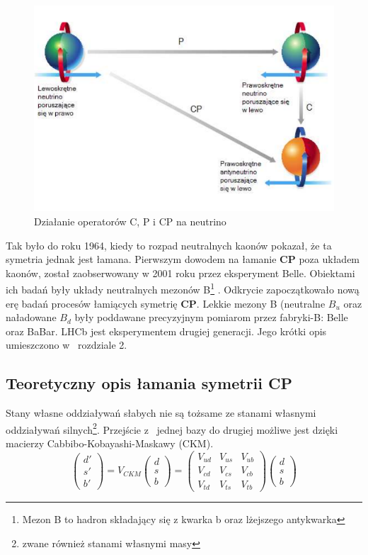  \begin{figure}[ht]
 \centering
 \includegraphics[scale=0.5]{rozdzial1/CP.png}
 \caption{Działanie operatorów C, P i CP na neutrino}
 \label{fig:CP}
\end{figure}


 Tak było do roku 1964, kiedy to rozpad neutralnych kaonów pokazał, że ta symetria jednak jest łamana. Pierwszym dowodem na łamanie  \textbf{CP} poza układem kaonów, został zaobserwowany w 2001 roku przez eksperyment Belle. Obiektami ich badań były układy neutralnych mezonów B\footnote{Mezon B to hadron składający się z kwarka b oraz lżejszego antykwarka } . Odkrycie zapoczątkowało nową erę badań procesów łamiących symetrię  \textbf{CP}. Lekkie mezony B (neutralne $B_u$ oraz naładowane $B_d$ były poddawane precyzyjnym pomiarom przez fabryki-B: Belle oraz BaBar. LHCb jest eksperymentem drugiej generacji. Jego krótki opis umieszczono w~  rozdziale 2.
\subsection{Teoretyczny opis łamania symetrii \textbf{CP} }

Stany własne oddziaływań słabych nie są tożsame ze stanami własnymi oddziaływań silnych\footnote{zwane również stanami własnymi masy}. Przejście z~ jednej bazy do drugiej możliwe jest dzięki macierzy Cabbibo-Kobayashi-Maskawy (CKM).
\begin{equation}
\begin{pmatrix}
d'\\ s' \\b'
\end{pmatrix} =V_{CKM} 
\begin{pmatrix}
d\\ s \\b
\end{pmatrix}=\begin{pmatrix}
V_{ud}& V_{us}&V_{ub}\\ V_{cd}& V_{cs}&V_{cb} \\ V_{td}& V_{ts}&V_{tb}
\end{pmatrix} \begin{pmatrix}
d\\ s \\b
\end{pmatrix}
\end{equation}

